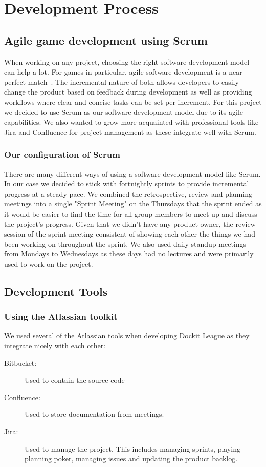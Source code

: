 \chapter{Development Process}
\label{chap:process}
\section{Agile game development using Scrum}
When working on any project, choosing the right software development model can help a lot. For games in particular, agile software development is a near perfect match~\cite{keith2010agile}. The incremental nature of both allows developers to easily change the product based on feedback during development as well as providing workflows where clear and concise tasks can be set per increment. For this project we decided to use Scrum as our software development model due to its agile capabilities. We also wanted to grow more acquainted with professional tools like Jira and Confluence for project management as these integrate well with Scrum.   

\subsection{Our configuration of Scrum}
There are many different ways of using a software development model like Scrum. In our case we decided to stick with fortnightly sprints to provide incremental progress at a steady pace. We combined the retrospective, review and planning meetings into a single "Sprint Meeting" on the Thursdays that the sprint ended as it would be easier to find the time for all group members to meet up and discuss the project's progress. 
Given that we didn't have any product owner, the review session of the sprint meeting consistent of showing each other the things we had been working on throughout the sprint. We also used daily standup meetings from Mondays to Wednesdays as these days had no lectures and were primarily used to work on the project. 

\section{Development Tools}
\subsection{Using the Atlassian toolkit}
We used several of the Atlassian tools when developing Dockit League as they integrate nicely with each other: 
\begin{description}
    \item[Bitbucket: ] Used to contain the source code
    \item[Confluence: ] Used to store documentation from meetings.
    \item[Jira: ] Used to manage the project. This includes managing sprints, playing planning poker, managing issues and updating the product backlog. 
\end{description}

